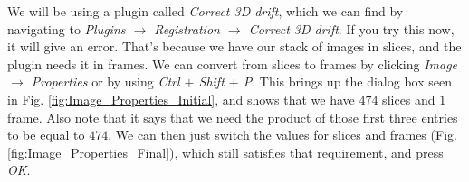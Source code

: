 \documentclass[letterpaper,12pt]{article}
\begin{document}
We will be using a plugin called \textcolor{myMagenta}{\textit{Correct 3D drift}}, which we can find by navigating to \textcolor{myMagenta}{\textit{Plugins $\rightarrow$ Registration $\rightarrow$ Correct 3D drift}}.  If you try this now, it will give an error.  That's because we have our stack of images in slices, and the plugin needs it in frames.  We can convert from slices to frames by clicking \textcolor{myMagenta}{\textit{Image $\rightarrow$ Properties}} or by using \textit{Ctrl $+$ Shift $+$ P}.  This brings up the dialog box seen in Fig. \ref{fig:Image_Properties_Initial}, and shows that we have $474$ slices and $1$ frame.  Also note that it says that we need the product of those first three entries to be equal to $474$.  We can then just switch the values for slices and frames (Fig. \ref{fig:Image_Properties_Final}), which still satisfies that requirement, and press \textit{OK}.  
\end{document}
